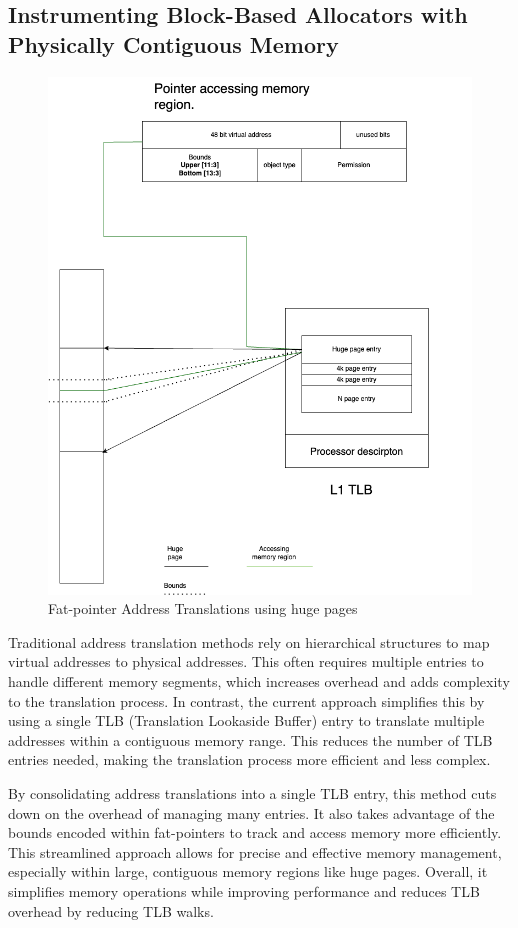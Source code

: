 \documentclass[11pt]{article}
\begin{document}
\subsection{Instrumenting Block-Based Allocators with Physically Contiguous Memory}
\label{sec:orgd7c897c}
\begin{figure}[htbp]
\centering
\includegraphics[width=.9\linewidth]{diagram/TLBAccess.drawio.png}
\caption{\label{fig:org710cee0}Fat-pointer Address Translations using huge pages}
\end{figure}

Traditional address translation methods rely on hierarchical
structures to map virtual addresses to physical addresses.
This often requires multiple entries to handle different
memory segments, which increases overhead and adds complexity
to the translation process. In contrast, the current approach
simplifies this by using a single TLB (Translation Lookaside Buffer)
entry to translate multiple addresses within a contiguous memory
range. This reduces the number of TLB entries needed, making the
translation process more efficient and less complex.

By consolidating address translations into a single TLB entry,
this method cuts down on the overhead of managing many entries.
It also takes advantage of the bounds encoded within fat-pointers
to track and access memory more efficiently. This streamlined
approach allows for precise and effective memory management,
especially within large, contiguous memory regions like huge pages.
Overall, it simplifies memory operations while improving performance
and reduces TLB overhead by reducing TLB walks.
\end{document}
